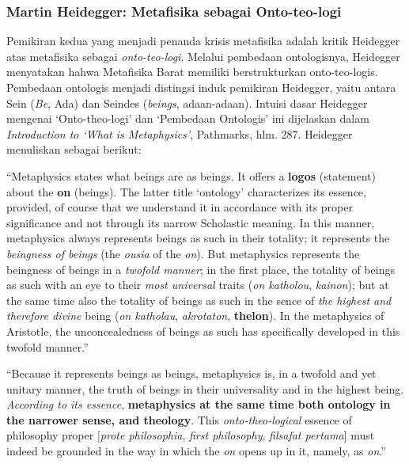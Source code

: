 \documentclass[10pt,a4paper]{article}
\renewenvironment{quote}
{\list{}{%
       \leftmargin 1.5em 
       \rightmargin 0em}
   \item\relax}
{\endlist}
\begin{document}
\begin{multicols}{2}
\hypertarget{martin-heidegger-metafisika-sebagai-onto-teo-logi}{%
\subsubsection{Martin Heidegger: Metafisika sebagai
Onto-teo-logi}\label{martin-heidegger-metafisika-sebagai-onto-teo-logi}}

Pemikiran kedua yang menjadi penanda krisis metafisika adalah kritik
Heidegger atas metafisika sebagai \emph{onto-teo-logi}. Melalui
pembedaan ontologisnya, Heidegger menyatakan hahwa Metafisika Barat
memiliki berstrukturkan onto-teo-logis. Pembedaan ontologis menjadi
distingsi induk pemikiran Heidegger, yaitu antara Sein (\emph{Be}, Ada)
dan Seindes (\emph{beings}, adaan-adaan). Intuisi dasar Heidegger
mengenai `Onto-theo-logi' dan `Pembedaan Ontologis' ini dijelaskan dalam
\emph{Introduction to `What is Metaphysics'}, Pathmarks, hlm. 287.
Heidegger menuliskan sebagai berikut:

\begin{quote}
``Metaphysics states what beings are as beings. It offers a
\textbf{logos} (statement) about the \textbf{on} (beings). The latter
title `ontology' characterizes its essence, provided, of course that we
understand it in accordance with its proper significance and not through
its narrow Scholastic meaning. In this manner, metaphysics always
represents beings as such in their totality; it represents the
\emph{beingness of beings} (the \emph{ousia} of the \emph{on}). But
metaphysics represents the beingness of beings in a \emph{twofold
manner}; in the first place, the totality of beings as such with an eye
to their \emph{most universal} traits (\emph{on katholou},
\emph{kainon}); but at the same time also the totality of beings as such
in the sence of \emph{the highest and therefore divine} being (\emph{on
katholau}, \emph{akrotaton}, \textbf{thelon}). In the metaphysics of
Aristotle, the unconcealedness of beings as such has specifically
developed in this twofold manner.''
\end{quote}

\begin{quote}
``Because it represents beings as beings, metaphysics is, in a twofold
and yet unitary manner, the truth of beings in their universality and in
the highest being. \emph{According to its essence}, \textbf{metaphysics
at the same time both ontology in the narrower sense, and theology}.
This \emph{onto-theo-logical} essence of philosophy proper
{[}\emph{prote philosophia}, \emph{first philosophy}, \emph{filsafat
pertama}{]} must indeed be grounded in the way in which the \emph{on}
opens up in it, namely, as \emph{on}.''
\end{quote}


\end{multicols}
\end{document}
